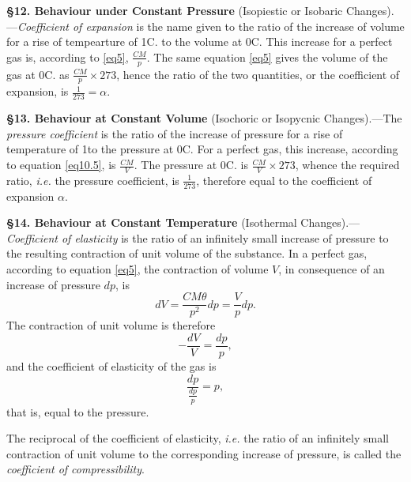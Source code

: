 \documentclass[oneside,12pt]{book}
\begin{document}
\textbf{\S 12. Behaviour under Constant Pressure} (Isopiestic or Isobaric Changes).---\textit{Coefficient of expansion} is the name given to the ratio of the increase of volume for a rise of tempearture of 1\degree C. to the volume at 0\degree C. This increase for a perfect gas is, according to \eqref{eq5}, $\frac{CM}{p}$. The same equation \eqref{eq5} gives the volume of the gas at 0\degree C. as $\frac{CM}{p}\times 273$, hence the ratio of the two quantities, or the coefficient of expansion, is $\frac{1}{273}=\alpha$. \par 

\textbf{\S 13. Behaviour at Constant Volume} (Isochoric or Isopycnic Changes).---The \textit{pressure coefficient} is the ratio of the increase of pressure for a rise of temperature of 1\degree to the pressure at 0\degree C. For a perfect gas, this increase, according to equation \eqref{eq10.5}, is $\frac{CM}{V}$. The pressure at 0\degree C. is $\frac{CM}{V}\times 273$, whence the required ratio, \textit{i.e.} the pressure coefficient, is $\frac{1}{273}$, therefore equal to the coefficient of expansion $\alpha$. \par 

\textbf{\S 14. Behaviour at Constant Temperature} (Isothermal Changes).---\textit{Coefficient of elasticity} is the ratio of an infinitely small increase of pressure to the resulting contraction of unit volume of the substance. In a perfect gas, according to equation \eqref{eq5}, the contraction of volume $V$, in consequence of an increase of pressure $dp$, is 
\begin{equation*}
    dV=\frac{CM\theta}{p^2}dp=\frac{V}{p}dp.
\end{equation*}
The contraction of unit volume is therefore 
\begin{equation*}
    -\frac{dV}{V}=\frac{dp}{p},
\end{equation*}
and the coefficient of elasticity of the gas is 
\begin{equation*}
    \frac{dp}{\frac{dp}{p}}=p,
\end{equation*}
that is, equal to the pressure. \par 

The reciprocal of the coefficient of elasticity, \textit{i.e.} the ratio of an infinitely small contraction of unit volume to the corresponding increase of pressure, is called the \textit{coefficient of compressibility}. \par 
\end{document}
